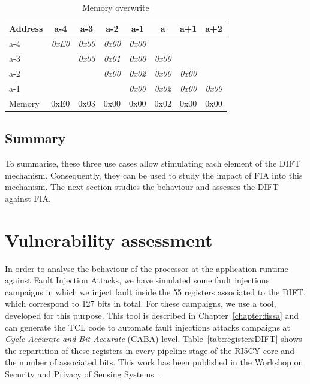 \begin{table}[t]
    \centering
    \footnotesize
    \caption{Memory overwrite}
    \label{table:ftpdOverwriteMemory}
    \begin{tabular}{l|ccccccc}
        \toprule
        Address & a-4 & a-3 & a-2 & a-1 & a & a+1 & a+2 \\ \midrule
        a-4     & \textit{0xE0} & \textit{0x00} & \textit{0x00} & \textit{0x00} & \textit{}     & \textit{}     & \textit{}     \\
        a-3     & \textit{}     & \textit{0x03} & \textit{0x01} & \textit{0x00} & \textit{0x00} & \textit{}     & \textit{}     \\
        a-2     & \textit{}     & \textit{}     & \textit{0x00} & \textit{0x02} & \textit{0x00} & \textit{0x00} & \textit{}     \\
        a-1     & \textit{}     & \textit{}     & \textit{}     & \textit{0x00} & \textit{0x02} & \textit{0x00} & \textit{0x00} \\ \midrule
        Memory & {0xE0}    & {0x03}    & 0x00          & 0x00          & 0x02          & 0x00          & 0x00          \\
        \bottomrule
    \end{tabular}
\end{table}

\subsection{Summary}
To summarise, these three use cases allow stimulating each element of the DIFT mechanism. Consequently, they can be used to study the impact of FIA into this mechanism. The next section studies the behaviour and assesses the DIFT against FIA.

\section{Vulnerability assessment}
\label{section:vuln_assessment}
In order to analyse the behaviour of the processor at the application runtime against Fault Injection Attacks, we have simulated some fault injections campaigns in which we inject fault inside the 55 registers associated to the DIFT, which correspond to 127 bits in total. For these campaigns, we use a tool, developed for this purpose. This tool is described in Chapter~\ref{chapter:fissa} and can generate the TCL code to automate fault injections attacks campaigns at\textit{ Cycle Accurate and Bit Accurate} (CABA) level.
Table~\ref{tab:registersDIFT} shows the repartition of these registers in every pipeline stage of the RI5CY core and the number of associated bits. This work has been published in the Workshop on Security and Privacy of Sensing Systems~\cite{PLG-22-SensorsSP}.


